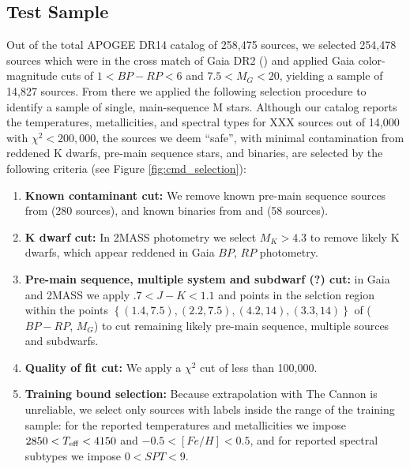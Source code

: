 \documentclass[preprint]{aastex62}
\begin{document}
\color{gcolor}{Further assessment of the reliability of our model for late types?...}\color{black}


\subsection{Test Sample \label{subsec:test_selection}} 
Out of the total APOGEE DR14 catalog of 258,475 sources, we selected 254,478 sources which were in the cross match of Gaia DR2 (\citealt{Brown:2018}) and applied Gaia color-magnitude cuts of $1<BP-RP<6$ and $7.5<M_G<20$, yielding a sample of 14,827 sources. From there we applied the following selection procedure to identify a sample of single, main-sequence M stars. Although our catalog reports the temperatures, metallicities, and spectral types for XXX sources out of 14,000 with $\chi^2<200,000$, the sources we deem ``safe'', with minimal contamination from reddened K dwarfs, pre-main sequence stars, and binaries, are selected by the following criteria (see Figure \ref{fig:cmd_selection}):

\begin{enumerate}
\item \textbf{Known contaminant cut:} We remove known pre-main sequence sources from \citealt{Cottaar:2014} (280 sources), and known binaries from \citealt{ElBadry:2018} and \citealt{Skinner:2018} (58 sources).

\item \textbf{K dwarf cut:} In 2MASS photometry we select $M_K > 4.3$ to remove likely K dwarfs, which appear reddened in Gaia $BP$, $RP$ photometry.

\item \textbf{Pre-main sequence, multiple system and subdwarf (?) cut:} in Gaia and 2MASS we apply $.7<J-K<1.1$ and points in the selction region within the points $\left\{ (1.4, 7.5), (2.2, 7.5), (4.2, 14), (3.3, 14) \right\}$ of ($BP-RP$, $M_G$) to cut remaining likely pre-main sequence, multiple sources and subdwarfs.

\item \textbf{Quality of fit cut:} We apply a $\chi^2$ cut of less than 100,000.

\item \textbf{Training bound selection:} Because extrapolation with The Cannon is unreliable, we select only sources with labels inside the range of the training sample: for the reported temperatures and metallicities we impose $2850<T_{\rm eff}<4150$ and $-0.5<[Fe/H]<0.5$, and for reported spectral subtypes we impose $0<SPT<9$.
\end{enumerate}
\end{document}
